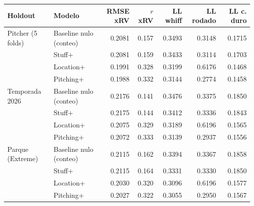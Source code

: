\begin{tabular}{llrrrrr}
\toprule
Holdout & Modelo & RMSE xRV & $r$ xRV & LL whiff & LL rodado & LL c. duro \\
\midrule
Pitcher (5 folds) & Baseline nulo (conteo) & 0.2081 & 0.157 & 0.3493 & 0.3148 & 0.1715 \\
 & Stuff+ & 0.2081 & 0.159 & 0.3433 & 0.3114 & 0.1703 \\
 & Location+ & 0.1991 & 0.328 & 0.3199 & 0.6176 & 0.1468 \\
 & Pitching+ & 0.1988 & 0.332 & 0.3144 & 0.2774 & 0.1458 \\
\midrule
Temporada 2026 & Baseline nulo (conteo) & 0.2176 & 0.141 & 0.3476 & 0.3375 & 0.1850 \\
 & Stuff+ & 0.2175 & 0.144 & 0.3412 & 0.3336 & 0.1843 \\
 & Location+ & 0.2075 & 0.329 & 0.3189 & 0.6196 & 0.1565 \\
 & Pitching+ & 0.2072 & 0.333 & 0.3139 & 0.2937 & 0.1556 \\
\midrule
Parque (Extreme) & Baseline nulo (conteo) & 0.2115 & 0.162 & 0.3394 & 0.3367 & 0.1858 \\
 & Stuff+ & 0.2115 & 0.164 & 0.3331 & 0.3330 & 0.1850 \\
 & Location+ & 0.2030 & 0.320 & 0.3096 & 0.6196 & 0.1577 \\
 & Pitching+ & 0.2027 & 0.322 & 0.3055 & 0.2950 & 0.1567 \\
\bottomrule
\end{tabular}
